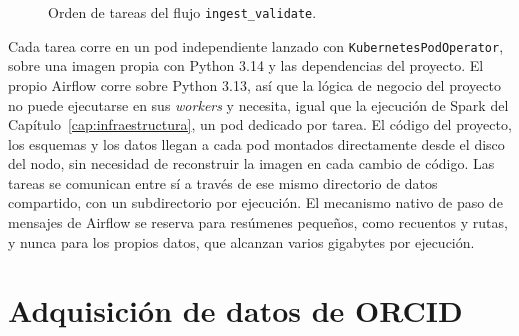 \begin{figure}[H]
  \centering
  \caption{Orden de tareas del flujo \texttt{ingest\_validate}.}
  \label{fig:tfm_ingest_dag}
\end{figure}

Cada tarea corre en un pod independiente lanzado con
\texttt{KubernetesPodOperator}, sobre una imagen propia con Python 3.14 y
las dependencias del proyecto. El propio Airflow corre sobre Python 3.13,
así que la lógica de negocio del proyecto no puede ejecutarse en sus
\textit{workers} y necesita, igual que la ejecución de Spark del
Capítulo~\ref{cap:infraestructura}, un pod dedicado por tarea. El código
del proyecto, los esquemas y los datos llegan a cada pod montados
directamente desde el disco del nodo, sin necesidad de reconstruir la
imagen en cada cambio de código. Las tareas se comunican entre sí a través
de ese mismo directorio de datos compartido, con un subdirectorio por
ejecución. El mecanismo nativo de paso de mensajes de Airflow se reserva
para resúmenes pequeños, como recuentos y rutas, y nunca para los propios
datos, que alcanzan varios gigabytes por ejecución.

\section{Adquisición de datos de ORCID}
\label{sec:ingesta_orcid}

